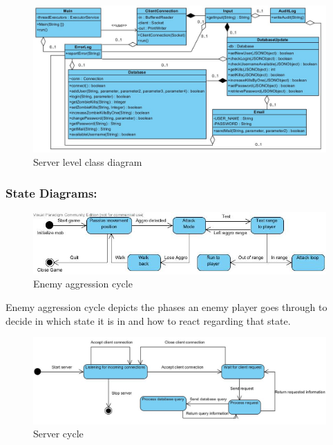 \documentclass[letterpaper]{article}
\begin{document}
					\begin{figure}[H]
					\centering
					\includegraphics[width=180mm]{UML_Diagram/Class/Server_Classes.jpg}
					\caption{Server level class diagram}
					\label{overflow}
					\end{figure}
					
				\vspace{0.2in}
				\subsubsection*{State Diagrams:}
				\vspace{0.1in}
					
					\begin{figure}[H]
					\centering
					\includegraphics[width=180mm]{UML_Diagram/State/Mob_Aggro.jpg}
					\caption{Enemy aggression cycle}
					\label{overflow}
					\end{figure}
					
					Enemy aggression cycle depicts the phases an enemy player goes through to decide in which state it is in and how to react regarding that state.
					
					\begin{figure}[H]
					\centering
					\includegraphics[width=180mm]{UML_Diagram/State/Server_State_Diagram.jpg}
					\caption{Server cycle}
					\label{overflow}
					\end{figure}
					
\end{document}

